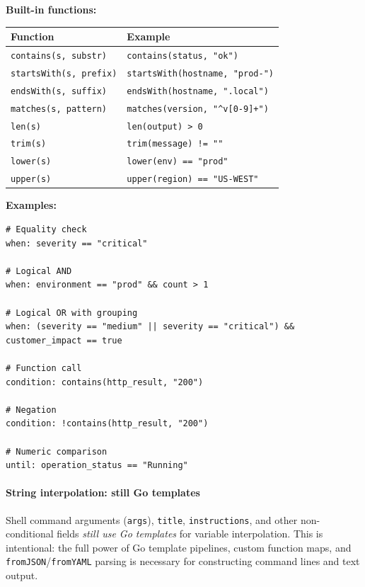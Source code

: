 \textbf{Built-in functions:}
\begin{center}
\begin{tabular}{ll}
\hline
\textbf{Function} & \textbf{Example} \\
\hline
\texttt{contains(s, substr)}     & \texttt{contains(status, "ok")} \\
\texttt{startsWith(s, prefix)}   & \texttt{startsWith(hostname, "prod-")} \\
\texttt{endsWith(s, suffix)}     & \texttt{endsWith(hostname, ".local")} \\
\texttt{matches(s, pattern)}     & \texttt{matches(version, "\^{}v[0-9]+")} \\
\texttt{len(s)}                  & \texttt{len(output) > 0} \\
\texttt{trim(s)}                 & \texttt{trim(message) != ""} \\
\texttt{lower(s)}                & \texttt{lower(env) == "prod"} \\
\texttt{upper(s)}                & \texttt{upper(region) == "US-WEST"} \\
\hline
\end{tabular}
\end{center}

\textbf{Examples:}
\begin{verbatim}
# Equality check
when: severity == "critical"

# Logical AND
when: environment == "prod" && count > 1

# Logical OR with grouping
when: (severity == "medium" || severity == "critical") && customer_impact == true

# Function call
condition: contains(http_result, "200")

# Negation
condition: !contains(http_result, "200")

# Numeric comparison
until: operation_status == "Running"
\end{verbatim}

\paragraph{String interpolation: still Go templates}

Shell command arguments (\texttt{args}), \texttt{title}, \texttt{instructions},
and other non-conditional fields \emph{still use Go templates} for variable
interpolation.  This is intentional: the full power of Go template pipelines,
custom function maps, and \texttt{fromJSON}/\texttt{fromYAML} parsing is
necessary for constructing command lines and text output.

